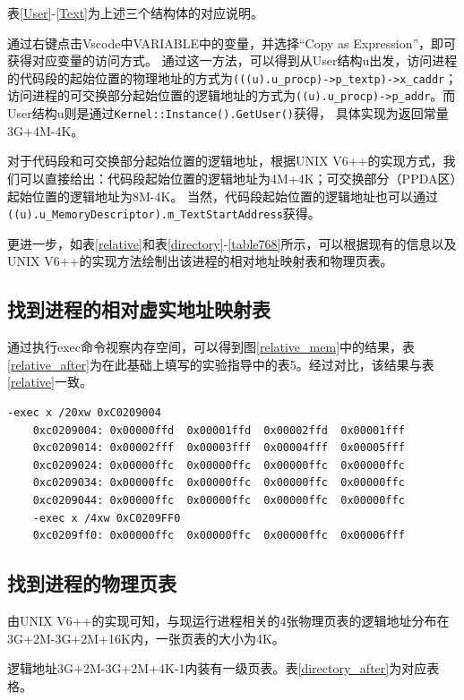 表\ref{User}-\ref{Text}为上述三个结构体的对应说明。

通过右键点击Vscode中VARIABLE中的变量，并选择“Copy as Expression”，即可获得对应变量的访问方式。
通过这一方法，可以得到从User结构u出发，访问进程的代码段的起始位置的物理地址的方式为\verb|(((u).u_procp)->p_textp)->x_caddr|；
访问进程的可交换部分起始位置的逻辑地址的方式为\verb|((u).u_procp)->p_addr|。而User结构u则是通过\verb|Kernel::Instance().GetUser()|获得，
具体实现为返回常量3G+4M-4K。

对于代码段和可交换部分起始位置的逻辑地址，根据UNIX V6++的实现方式，我们可以直接给出：代码段起始位置的逻辑地址为4M+4K；可交换部分（PPDA区）起始位置的逻辑地址为8M-4K。
当然，代码段起始位置的逻辑地址也可以通过\verb|((u).u_MemoryDescriptor).m_TextStartAddress|获得。

更进一步，如表\ref{relative}和表\ref{directory}-\ref{table768}所示，可以根据现有的信息以及UNIX V6++的实现方法绘制出该进程的相对地址映射表和物理页表。

\subsection{找到进程的相对虚实地址映射表}

    通过执行exec命令视察内存空间，可以得到图\ref{relative_mem}中的结果，表\ref{relative_after}为在此基础上填写的实验指导中的表5。经过对比，该结果与表\ref{relative}一致。

\begin{Verbatim}[frame=single,fontsize=\small]
    -exec x /20xw 0xC0209004
    0xc0209004:	0x00000ffd	0x00001ffd	0x00002ffd	0x00001fff
    0xc0209014:	0x00002fff	0x00003fff	0x00004fff	0x00005fff
    0xc0209024:	0x00000ffc	0x00000ffc	0x00000ffc	0x00000ffc
    0xc0209034:	0x00000ffc	0x00000ffc	0x00000ffc	0x00000ffc
    0xc0209044:	0x00000ffc	0x00000ffc	0x00000ffc	0x00000ffc    
    -exec x /4xw 0xC0209FF0
    0xc0209ff0:	0x00000ffc	0x00000ffc	0x00000ffc	0x00006fff
\end{Verbatim}
\label{relative_mem}

\subsection{找到进程的物理页表}

由UNIX V6++的实现可知，与现运行进程相关的4张物理页表的逻辑地址分布在3G+2M-3G+2M+16K内，一张页表的大小为4K。

逻辑地址3G+2M-3G+2M+4K-1内装有一级页表。表\ref{directory_after}为对应表格。

